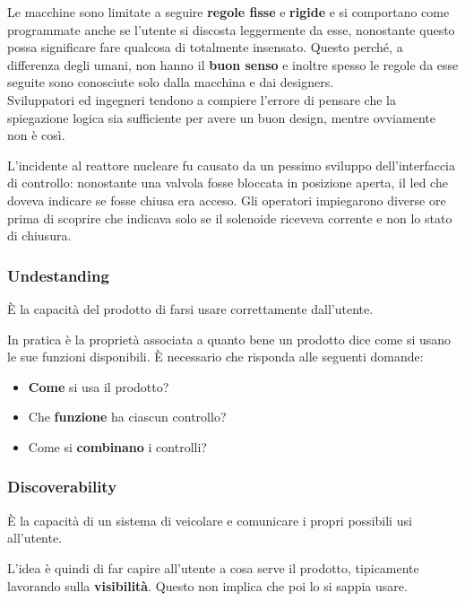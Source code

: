 Le macchine sono limitate a seguire \textbf{regole fisse} e \textbf{rigide} e si comportano come programmate anche se l'utente si discosta leggermente da esse, nonostante questo possa significare fare qualcosa di totalmente insensato. Questo perché, a differenza degli umani, non hanno il \textbf{buon senso} e inoltre spesso le regole da esse seguite sono conosciute solo dalla macchina e dai designers.\\

Sviluppatori ed ingegneri tendono a compiere l'errore di pensare che la spiegazione logica sia sufficiente per avere un buon design, mentre ovviamente non è così.

\begin{example}
	L'incidente al reattore nucleare fu causato da un pessimo sviluppo dell'interfaccia di controllo: nonostante una valvola fosse bloccata in posizione aperta, il led che doveva indicare se fosse chiusa era acceso. Gli operatori impiegarono diverse ore prima di scoprire che indicava solo se il solenoide riceveva corrente e non lo stato di chiusura.	
\end{example}

\subsubsection{Undestanding}
\begin{definition}[Understanding]
	È la capacità del prodotto di farsi usare correttamente dall'utente.
\end{definition}
In pratica è la proprietà associata a quanto bene un prodotto dice come si usano le sue funzioni disponibili. È necessario che risponda alle seguenti domande:
\begin{itemize}
	\item \textbf{Come} si usa il prodotto?
	\item Che \textbf{funzione} ha ciascun controllo?
	\item Come si \textbf{combinano} i controlli?
\end{itemize}

\subsubsection{Discoverability}
\begin{definition}[Discoverability]
	È la capacità di un sistema di veicolare e comunicare i propri possibili usi all'utente.
\end{definition}
L'idea è quindi di far capire all'utente a cosa serve il prodotto, tipicamente lavorando sulla \textbf{visibilità}. Questo non implica che poi lo si sappia usare.\\

